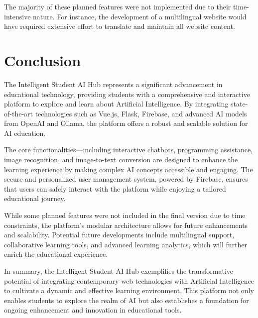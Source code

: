 The majority of these planned features were not implemented due to their time-intensive nature. For instance, the development of a multilingual website would have required extensive effort to translate and maintain all website content.

\section{Conclusion}

The Intelligent Student AI Hub represents a significant advancement in educational technology, 
providing students with a comprehensive and interactive platform to explore and learn about Artificial Intelligence. 
By integrating state-of-the-art technologies such as Vue.js, Flask, Firebase, and advanced AI models from OpenAI and Ollama, 
the platform offers a robust and scalable solution for AI education.

The core functionalities—including interactive chatbots, programming assistance, image recognition, 
and image-to-text conversion are designed to enhance the learning experience by making complex AI concepts accessible and engaging. 
The secure and personalized user management system, powered by Firebase, ensures that users can safely interact with the platform while enjoying a tailored educational journey.

While some planned features were not included in the final version due to time constraints, the platform's modular architecture allows for future enhancements and scalability.
Potential future developments include multilingual support, collaborative learning tools, and advanced learning analytics, 
which will further enrich the educational experience.

In summary, the Intelligent Student AI Hub exemplifies the transformative potential of integrating contemporary web technologies
with Artificial Intelligence to cultivate a dynamic and effective learning environment. This platform not only enables students 
to explore the realm of AI but also establishes a foundation for ongoing enhancement and innovation in educational tools. 


